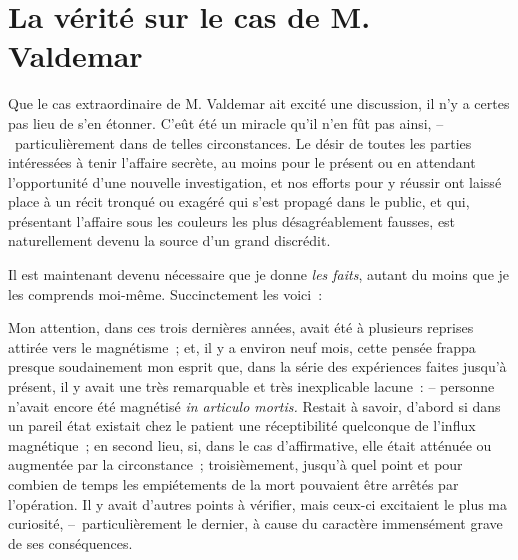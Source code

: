 \documentclass[french,twoside]{book} %
\begin{document}
\section[{La vérité sur le cas de M. Valdemar}]{La vérité sur le cas de M. Valdemar}\renewcommand{\leftmark}{La vérité sur le cas de M. Valdemar}

\noindent Que le cas extraordinaire de M. Valdemar ait excité une discussion, il n’y a certes pas lieu de s’en étonner. C’eût été un miracle qu’il n’en fût pas ainsi, – particulièrement dans de telles circonstances. Le désir de toutes les parties intéressées à tenir l’affaire secrète, au moins pour le présent ou en attendant l’opportunité d’une nouvelle investigation, et nos efforts pour y réussir ont laissé place à un récit tronqué ou exagéré qui s’est propagé dans le public, et qui, présentant l’affaire sous les couleurs les plus désagréablement fausses, est naturellement devenu la source d’un grand discrédit.\par
Il est maintenant devenu nécessaire que je donne \emph{les faits}, autant du moins que je les comprends moi-même. Succinctement les voici :\par
Mon attention, dans ces trois dernières années, avait été à plusieurs reprises attirée vers le magnétisme ; et, il y a environ neuf mois, cette pensée frappa presque soudainement mon esprit que, dans la série des expériences faites jusqu’à présent, il y avait une très remarquable et très inexplicable lacune : – personne n’avait encore été magnétisé \emph{in articulo mortis.} Restait à savoir, d’abord si dans un pareil état existait chez le patient une réceptibilité quelconque de l’influx magnétique ; en second lieu, si, dans le cas d’affirmative, elle était atténuée ou augmentée par la circonstance ; troisièmement, jusqu’à quel point et pour combien de temps les empiétements de la mort pouvaient être arrêtés par l’opération. Il y avait d’autres points à vérifier, mais ceux-ci excitaient le plus ma curiosité, – particulièrement le dernier, à cause du caractère immensément grave de ses conséquences.\par
\end{document}
